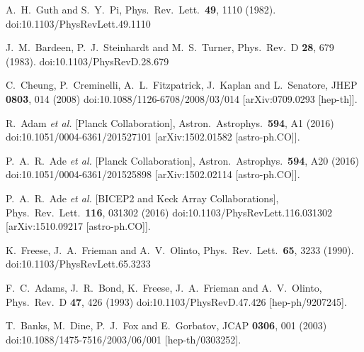 \documentclass[12pt]{article}
\begin{document}
\begin{thebibliography}{99}
  A.~H.~Guth and S.~Y.~Pi,
  Phys.\ Rev.\ Lett.\  {\bf 49}, 1110 (1982).
  doi:10.1103/PhysRevLett.49.1110

  J.~M.~Bardeen, P.~J.~Steinhardt and M.~S.~Turner,
  Phys.\ Rev.\ D {\bf 28}, 679 (1983).
  doi:10.1103/PhysRevD.28.679

  C.~Cheung, P.~Creminelli, A.~L.~Fitzpatrick, J.~Kaplan and L.~Senatore,
  JHEP {\bf 0803}, 014 (2008)
  doi:10.1088/1126-6708/2008/03/014
  [arXiv:0709.0293 [hep-th]].

  R.~Adam {\it et al.} [Planck Collaboration],
  Astron.\ Astrophys.\  {\bf 594}, A1 (2016)
  doi:10.1051/0004-6361/201527101
  [arXiv:1502.01582 [astro-ph.CO]].

  P.~A.~R.~Ade {\it et al.} [Planck Collaboration],
  Astron.\ Astrophys.\  {\bf 594}, A20 (2016)
  doi:10.1051/0004-6361/201525898
  [arXiv:1502.02114 [astro-ph.CO]].

  P.~A.~R.~Ade {\it et al.} [BICEP2 and Keck Array Collaborations],
  Phys.\ Rev.\ Lett.\  {\bf 116}, 031302 (2016)
  doi:10.1103/PhysRevLett.116.031302
  [arXiv:1510.09217 [astro-ph.CO]].

  K.~Freese, J.~A.~Frieman and A.~V.~Olinto,
  Phys.\ Rev.\ Lett.\  {\bf 65}, 3233 (1990).
  doi:10.1103/PhysRevLett.65.3233

  F.~C.~Adams, J.~R.~Bond, K.~Freese, J.~A.~Frieman and A.~V.~Olinto,
  Phys.\ Rev.\ D {\bf 47}, 426 (1993)
  doi:10.1103/PhysRevD.47.426
  [hep-ph/9207245].

  T.~Banks, M.~Dine, P.~J.~Fox and E.~Gorbatov,
  JCAP {\bf 0306}, 001 (2003)
  doi:10.1088/1475-7516/2003/06/001
  [hep-th/0303252].


\end{thebibliography}
\end{document}
